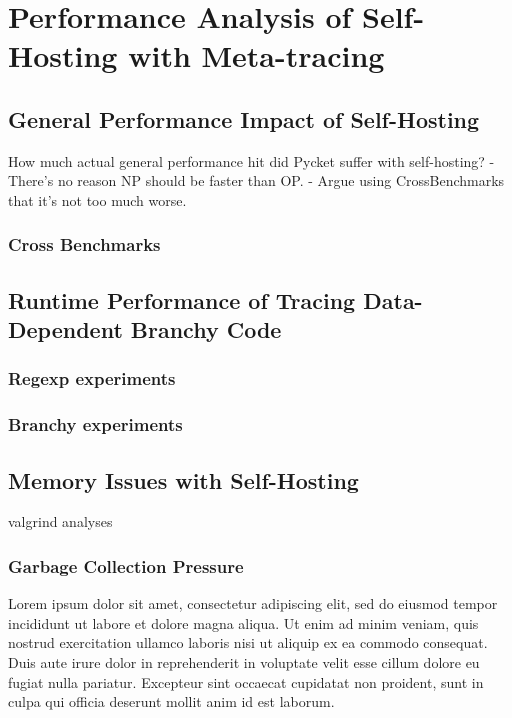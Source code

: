 \chapter{Performance Analysis of Self-Hosting with Meta-tracing}

	\section{General Performance Impact of Self-Hosting}
	
	How much actual general performance hit did Pycket suffer with self-hosting?
		- There's no reason NP should be faster than OP.
		- Argue using CrossBenchmarks that it's not too much worse.

		\subsection{Cross Benchmarks}

	\section{Runtime Performance of Tracing Data-Dependent Branchy Code}
		\subsection{Regexp experiments}
		\subsection{Branchy experiments}

	\section{Memory Issues with Self-Hosting}
		valgrind analyses
		\subsection{Garbage Collection Pressure}

Lorem ipsum dolor sit amet, consectetur adipiscing elit, sed do eiusmod tempor incididunt ut labore et dolore magna aliqua. Ut enim ad minim veniam, quis nostrud exercitation ullamco laboris nisi ut aliquip ex ea commodo consequat. Duis aute irure dolor in reprehenderit in voluptate velit esse cillum dolore eu fugiat nulla pariatur. Excepteur sint occaecat cupidatat non proident, sunt in culpa qui officia deserunt mollit anim id est laborum.
